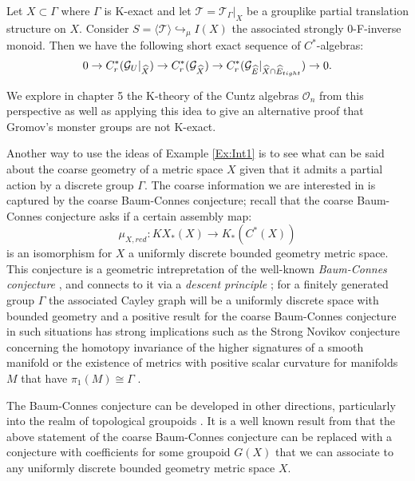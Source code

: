 \begin{thm}
Let $X \subset \Gamma$ where $\Gamma$ is K-exact and let $\mathcal{T}=\mathcal{T}_{\Gamma}|_{X}$ be a grouplike partial translation structure on $X$. Consider $S=\langle \mathcal{T} \rangle \hookrightarrow_{\mu} I(X)$ the associated strongly 0-F-inverse monoid. Then we have the following short exact sequence of $C^{*}$-algebras:
\begin{equation*}
0 \rightarrow C^{*}_{r}(\mathcal{G}_{U}|_{\widehat{X}}) \rightarrow C^{*}_{r}(\mathcal{G}_{\widehat{X}}) \rightarrow C^{*}_{r}(\mathcal{G}_{\widehat{E}}|_{\widehat{X}\cap\widehat{E}_{tight}}) \rightarrow 0.
\end{equation*}
\end{thm}

We explore in chapter 5 the K-theory of the Cuntz algebras $\mathcal{O}_{n}$ from this perspective as well as applying this idea to give an alternative proof that Gromov's monster groups \cite{MR1978492,exrangrps} are not K-exact.

Another way to use the ideas of Example \ref{Ex:Int1} is to see what can be said about the coarse geometry of a metric space $X$ given that it admits a partial action by a discrete group $\Gamma$. The coarse information we are interested in is captured by the coarse Baum-Connes conjecture; recall that the coarse Baum-Connes conjecture \cite{MR1388312} asks if a certain assembly map:
\begin{equation*}
\mu_{X,red}:KX_{*}(X) \longrightarrow K_{*}(C^{*}(X))
\end{equation*}
is an isomorphism for $X$ a uniformly discrete bounded geometry metric space. This conjecture is a geometric intrepretation of the well-known \textit{Baum-Connes conjecture} \cite{MR1292018}, and connects to it via a \textit{descent principle} \cite{MR1399087,MR1817560}; for a finitely generated group $\Gamma$ the associated Cayley graph will be a uniformly discrete space with bounded geometry and a positive result for the coarse Baum-Connes conjecture in such situations has strong implications such as the Strong Novikov conjecture concerning the homotopy invariance of the higher signatures of a smooth manifold \cite{MR866507} or the existence of metrics with positive scalar curvature for manifolds $M$ that have $\pi_{1}(M)\cong \Gamma$ \cite{MR1817560}.

The Baum-Connes conjecture can be developed in other directions, particularly into the realm of topological groupoids \cite{MR1798599}. It is a well known result from \cite{MR1905840} that the above statement of the coarse Baum-Connes conjecture can be replaced with a conjecture with coefficients for some groupoid $G(X)$ that we can associate to any uniformly discrete bounded geometry metric space $X$.

